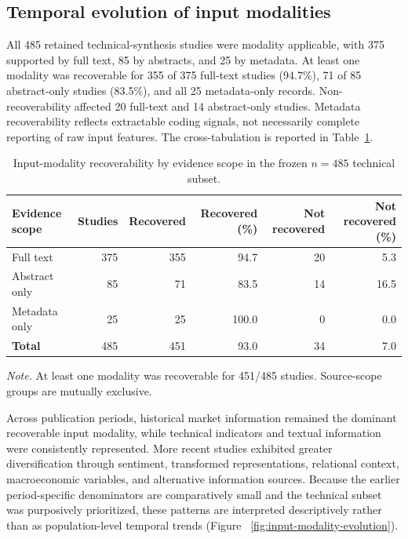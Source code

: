 \documentclass[pdflatex,sn-mathphys-num]{sn-jnl}%
\theoremstyle{thmstyleone}%
\theoremstyle{thmstyletwo}%
\theoremstyle{thmstylethree}%
\begin{document}
\subsection{Temporal evolution of input modalities}
\label{subsec:input-modality-evolution}

All 485 retained technical-synthesis studies were modality applicable,
with 375 supported by full text, 85 by abstracts, and 25 by metadata.
At least one modality was recoverable for 355 of 375 full-text studies
(94.7\%), 71 of 85 abstract-only studies (83.5\%), and all 25
metadata-only records. Non-recoverability affected 20 full-text and
14 abstract-only studies. Metadata recoverability reflects extractable
coding signals, not necessarily complete reporting of raw input features.
The cross-tabulation is reported in Table~\ref{tab:modality-recoverability}.

\begin{table}[!htbp]
\centering
\caption{Input-modality recoverability by evidence scope in the frozen $n=485$ technical subset.}
\label{tab:modality-recoverability}
\small
\setlength{\tabcolsep}{4pt}
\renewcommand{\arraystretch}{1.12}
\begin{tabular}{lrrrrr}
\toprule
Evidence scope & Studies & Recovered & Recovered (\%) & Not recovered & Not recovered (\%) \\
\midrule
Full text & 375 & 355 & 94.7 & 20 & 5.3 \\
Abstract only & 85 & 71 & 83.5 & 14 & 16.5 \\
Metadata only & 25 & 25 & 100.0 & 0 & 0.0 \\
\textbf{Total} & 485 & 451 & 93.0 & 34 & 7.0 \\
\bottomrule
\end{tabular}

\vspace{1mm}
\begin{minipage}{0.97\linewidth}
\footnotesize
\textit{Note.} At least one modality was recoverable for 451/485 studies. Source-scope groups are mutually exclusive.
\end{minipage}
\end{table}


\FloatBarrier


Across publication periods, historical market information remained the
dominant recoverable input modality, while technical indicators and textual
information were consistently represented. More recent studies exhibited
greater diversification through sentiment, transformed representations,
relational context, macroeconomic variables, and alternative information
sources. Because the earlier period-specific denominators are comparatively
small and the technical subset was purposively prioritized, these patterns
are interpreted descriptively rather than as population-level temporal
trends (Figure ~\ref{fig:input-modality-evolution}).
\end{document}
